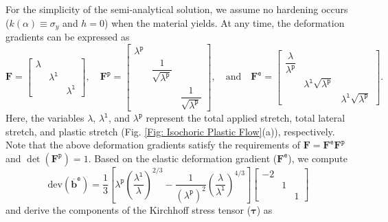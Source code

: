 \documentclass[preprint,11pt]{elsarticle}
\theoremstyle{definition}
\begin{document}
For the simplicity of the semi-analytical solution, we assume no hardening occurs ($k(\alpha) \equiv \sigma_y$ and $h=0$) when the material yields. At any time, the deformation gradients can be expressed as
\begin{equation*}
    \mathbf{F} = \left[ \begin{array}{ccc}
        \lambda & & \\
        & \lambda^\texttt{l} & \\
        & & \lambda^\texttt{l}
    \end{array} \right], \quad
    \mathbf{F}^\texttt{p} = \left[ \begin{array}{ccc}
        \lambda^\texttt{p} & & \\
        & \dfrac{1}{\sqrt{\lambda^\texttt{p}}} & \\
        & & \dfrac{1}{\sqrt{\lambda^\texttt{p}}}
    \end{array} \right], \quad \text{and} \quad
    \mathbf{F}^\texttt{e} = \left[ \begin{array}{ccc}
        \dfrac{\lambda}{\lambda^\texttt{p}} & & \\
        & \lambda^\texttt{l} \sqrt{\lambda^\texttt{p}} & \\
        & & \lambda^\texttt{l} \sqrt{\lambda^\texttt{p}}
    \end{array} \right].
\end{equation*}
Here, the variables $\lambda$, $\lambda^\texttt{l}$, and $\lambda^\texttt{p}$ represent the total applied stretch, total lateral stretch, and plastic stretch (Fig. \ref{Fig: Isochoric Plastic Flow}(a)), respectively. Note that the above deformation gradients satisfy the requirements of $\mathbf{F} = \mathbf{F}^\texttt{e} \mathbf{F}^\texttt{p}$ and $\det(\mathbf{F}^\texttt{p}) = 1$. Based on the elastic deformation gradient ($\mathbf{F}^\texttt{e}$), we compute
\begin{equation*}
    \text{dev} (\overline{\mathbf{b}}^\texttt{e}) = \dfrac{1}{3} \left[ \lambda^\texttt{p} \left( \dfrac{\lambda^\texttt{l}}{\lambda} \right)^{2/3}
    - \dfrac{1}{(\lambda^\texttt{p})^2} \left( \dfrac{\lambda}{\lambda^\texttt{l}} \right)^{4/3} \right]
    \left[ \begin{array}{ccc}
        -2 & & \\
        & 1 & \\
        & & 1
    \end{array} \right]
\end{equation*}
and derive the components of the Kirchhoff stress tensor ($\boldsymbol{\tau}$) as
\end{document}

